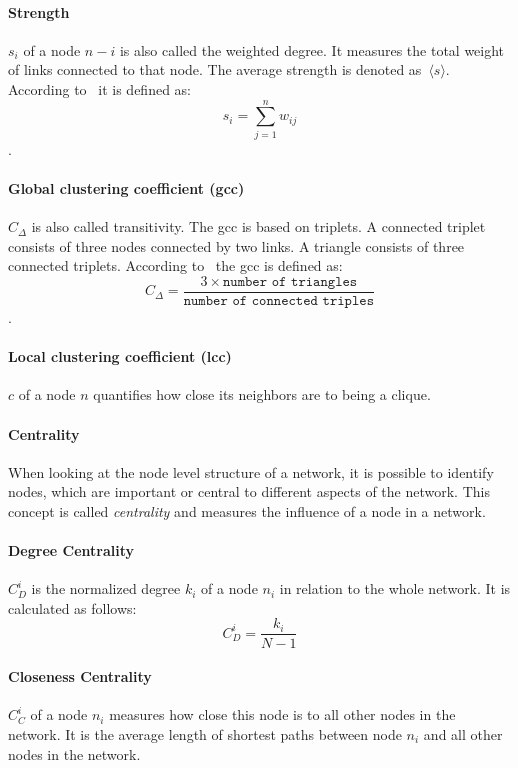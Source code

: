 \paragraph{Strength} $s_i$ of a node $n-i$ is also called the weighted degree.
It measures the total weight of links connected to that node.
The average strength is denoted as~$\langle s \rangle$.
According to~\textcite{barrat2004architecture} it is defined as:
$$s_i = \sum_{j=1}^{n}w_{ij}$$. 

\paragraph{Global clustering coefficient (gcc)} $C_\Delta$ is also called transitivity. The gcc is based on triplets. A connected triplet consists of three nodes connected by two links. A triangle consists of three connected triplets. 
 According to~\textcite{wasserman1994social} the gcc is defined as: $$C_\Delta = \frac{3 \times \texttt{number of triangles}}{\texttt{number of connected triples}}$$.

\paragraph{Local clustering coefficient (lcc)} $c$ of a node $n$ quantifies how close its neighbors are
to being a clique.

\paragraph{Centrality}
When looking at the node level structure of a network, it is possible to identify nodes, which are important or central to different aspects of the network. This concept is called \emph{centrality} and measures the influence of a node in a network.

\paragraph{Degree Centrality}
$C^i_D$ is the normalized degree $k_i$ of a node $n_i$ in relation to the whole network. It is calculated as follows:
$$C^i_D=\frac{k_i}{N-1}$$

\paragraph{Closeness Centrality}
$C^i_C$ of a node $n_i$ measures how close this node is to all other nodes in the network. 
It is the average length of shortest paths between node $n_i$ and all other nodes in the network.

